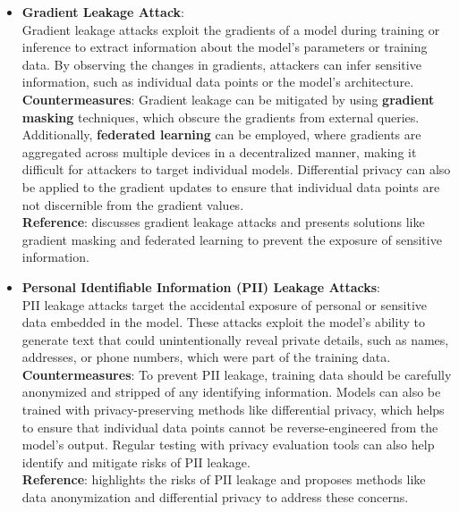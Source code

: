 \documentclass[12pt]{article}
\begin{document}
\begin{itemize}
        \item \textbf{Gradient Leakage Attack}: \\
        Gradient leakage attacks exploit the gradients of a model during training or inference to extract information about the model’s parameters or training data. By observing the changes in gradients, attackers can infer sensitive information, such as individual data points or the model’s architecture. \\
        \textbf{Countermeasures}: Gradient leakage can be mitigated by using \textbf{gradient masking} techniques, which obscure the gradients from external queries. Additionally, \textbf{federated learning} can be employed, where gradients are aggregated across multiple devices in a decentralized manner, making it difficult for attackers to target individual models. Differential privacy can also be applied to the gradient updates to ensure that individual data points are not discernible from the gradient values. \\
        \textbf{Reference}: \cite{Zhu_2020} discusses gradient leakage attacks and presents solutions like gradient masking and federated learning to prevent the exposure of sensitive information.

        \item \textbf{Personal Identifiable Information (PII) Leakage Attacks}: \\
        PII leakage attacks target the accidental exposure of personal or sensitive data embedded in the model. These attacks exploit the model's ability to generate text that could unintentionally reveal private details, such as names, addresses, or phone numbers, which were part of the training data. \\
        \textbf{Countermeasures}: To prevent PII leakage, training data should be carefully anonymized and stripped of any identifying information. Models can also be trained with privacy-preserving methods like differential privacy, which helps to ensure that individual data points cannot be reverse-engineered from the model’s output. Regular testing with privacy evaluation tools can also help identify and mitigate risks of PII leakage. \\
        \textbf{Reference}: \cite{Carlini_2021} highlights the risks of PII leakage and proposes methods like data anonymization and differential privacy to address these concerns.

    \end{itemize}
\end{document}
